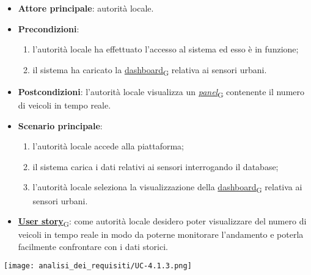 \newpage
{}
\begin{itemize}
	\item \textbf{Attore principale}: autorità locale.
	\item \textbf{Precondizioni}:
	      \begin{enumerate}
		      \item l'autorità locale ha effettuato l'accesso al sistema ed esso è in funzione;
		      \item il sistema ha caricato la \href{https://7last.github.io/docs/pb/documentazione-interna/glossario\#dashboard}{dashboard\textsubscript{G}} relativa ai sensori urbani.
	      \end{enumerate}
	\item \textbf{Postcondizioni}: l'autorità locale visualizza un \href{https://7last.github.io/docs/pb/documentazione-interna/glossario\#panel}{\textit{panel}\textsubscript{G}} contenente il numero di veicoli in tempo reale.
	\item \textbf{Scenario principale}:
	      \begin{enumerate}
		      \item l'autorità locale accede alla piattaforma;
		      \item il sistema carica i dati relativi ai sensori interrogando il database;
		      \item l'autorità locale seleziona la visualizzazione della \href{https://7last.github.io/docs/pb/documentazione-interna/glossario\#dashboard}{dashboard\textsubscript{G}} relativa ai sensori urbani.
	      \end{enumerate}
	\item \href{https://7last.github.io/docs/pb/documentazione-interna/glossario\#user-story}{\textbf{User story}\textsubscript{G}}:
	      come autorità locale desidero poter visualizzare del numero di veicoli in tempo reale in modo da poterne monitorare l'andamento
	      e poterla facilmente confrontare con i dati storici.
\end{itemize}
\begin{center}
	\texttt{[image: analisi\_dei\_requisiti/UC-4.1.3.png]}
\end{center}

